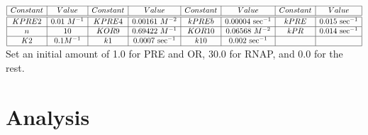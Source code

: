 \documentclass[titlepage,11pt]{article}
\begin{document}
\begin{enumerate}
\begin{center}
\begin{math}
\begin{array}{|c|c|c|c|c|c|c|c|}
\hline
Constant & Value & Constant & Value &
Constant & Value & Constant & Value \\ \hline \hline
KPRE2  & 0.01~M^{-1} & KPRE4  & 0.00161~M^{-2} & 
kPREb  & 0.00004~\mathrm{sec}^{-1} & 
kPRE   & 0.015~\mathrm{sec}^{-1} \\ \hline
n         & 10 & KOR9  & 0.69422~M^{-1} & KOR10  & 0.06568~M^{-2} &
kPR    & 0.014~\mathrm{sec}^{-1} \\ \hline
K2       & 0.1 M^{-1} & k1       & 0.0007~\mathrm{sec}^{-1} &
k10    & 0.002~\mathrm{sec}^{-1} & ~ & ~ \\ \hline
\end{array}
\end{math}
Set an initial amount of 1.0 for PRE and OR, 30.0 for RNAP, and 0.0 
for the rest.
\end{center}
\end{enumerate}

\section{Analysis}
\end{document}

